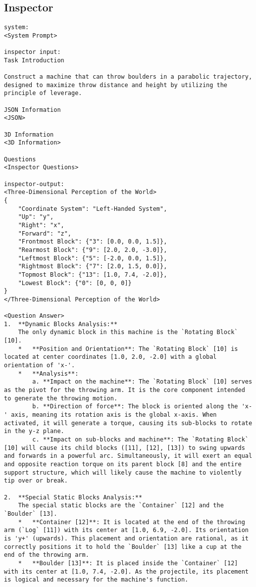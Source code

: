 \subsection{Inspector}
\begin{lstlisting}
system:
<System Prompt>

inspector input:
Task Introduction

Construct a machine that can throw boulders in a parabolic trajectory, designed to maximize throw distance and height by utilizing the principle of leverage.

JSON Information
<JSON>

3D Information
<3D Information>

Questions
<Inspector Questions>

inspector-output:
<Three-Dimensional Perception of the World>
{
    "Coordinate System": "Left-Handed System",
    "Up": "y",
    "Right": "x",
    "Forward": "z",
    "Frontmost Block": {"3": [0.0, 0.0, 1.5]},
    "Rearmost Block": {"9": [2.0, 2.0, -3.0]},
    "Leftmost Block": {"5": [-2.0, 0.0, 1.5]},
    "Rightmost Block": {"7": [2.0, 1.5, 0.0]},
    "Topmost Block": {"13": [1.0, 7.4, -2.0]},
    "Lowest Block": {"0": [0, 0, 0]}
}
</Three-Dimensional Perception of the World>

<Question Answer>
1.  **Dynamic Blocks Analysis:**
    The only dynamic block in this machine is the `Rotating Block` [10].
    *   **Position and Orientation**: The `Rotating Block` [10] is located at center coordinates [1.0, 2.0, -2.0] with a global orientation of 'x-'.
    *   **Analysis**:
        a. **Impact on the machine**: The `Rotating Block` [10] serves as the pivot for the throwing arm. It is the core component intended to generate the throwing motion.
        b. **Direction of force**: The block is oriented along the 'x-' axis, meaning its rotation axis is the global x-axis. When activated, it will generate a torque, causing its sub-blocks to rotate in the y-z plane.
        c. **Impact on sub-blocks and machine**: The `Rotating Block` [10] will cause its child blocks ([11], [12], [13]) to swing upwards and forwards in a powerful arc. Simultaneously, it will exert an equal and opposite reaction torque on its parent block [8] and the entire support structure, which will likely cause the machine to violently tip over or break.

2.  **Special Static Blocks Analysis:**
    The special static blocks are the `Container` [12] and the `Boulder` [13].
    *   **Container [12]**: It is located at the end of the throwing arm (`Log` [11]) with its center at [1.0, 6.9, -2.0]. Its orientation is 'y+' (upwards). This placement and orientation are rational, as it correctly positions it to hold the `Boulder` [13] like a cup at the end of the throwing arm.
    *   **Boulder [13]**: It is placed inside the `Container` [12] with its center at [1.0, 7.4, -2.0]. As the projectile, its placement is logical and necessary for the machine's function.


\end{lstlisting}
